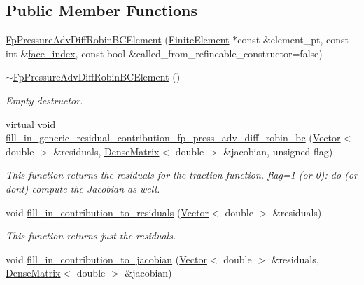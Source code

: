\subsection*{Public Member Functions}
\begin{DoxyCompactItemize}
\item 
\hyperlink{classoomph_1_1FpPressureAdvDiffRobinBCElement_a9a21514d6237032042035c70fc14fd7a}{Fp\+Pressure\+Adv\+Diff\+Robin\+B\+C\+Element} (\hyperlink{classoomph_1_1FiniteElement}{Finite\+Element} $\ast$const \&element\+\_\+pt, const int \&\hyperlink{classoomph_1_1FaceElement_a478d577ac6db67ecc80f1f02ae3ab170}{face\+\_\+index}, const bool \&called\+\_\+from\+\_\+refineable\+\_\+constructor=false)
\item 
\hyperlink{classoomph_1_1FpPressureAdvDiffRobinBCElement_af684bf56d91023d4adaaaec1419a3216}{$\sim$\+Fp\+Pressure\+Adv\+Diff\+Robin\+B\+C\+Element} ()
\begin{DoxyCompactList}\small\item\em Empty destructor. \end{DoxyCompactList}\item 
virtual void \hyperlink{classoomph_1_1FpPressureAdvDiffRobinBCElement_a6a902a30a8b1c2d4105a7c0639a81f58}{fill\+\_\+in\+\_\+generic\+\_\+residual\+\_\+contribution\+\_\+fp\+\_\+press\+\_\+adv\+\_\+diff\+\_\+robin\+\_\+bc} (\hyperlink{classoomph_1_1Vector}{Vector}$<$ double $>$ \&residuals, \hyperlink{classoomph_1_1DenseMatrix}{Dense\+Matrix}$<$ double $>$ \&jacobian, unsigned flag)
\begin{DoxyCompactList}\small\item\em This function returns the residuals for the traction function. flag=1 (or 0)\+: do (or don\textquotesingle{}t) compute the Jacobian as well. \end{DoxyCompactList}\item 
void \hyperlink{classoomph_1_1FpPressureAdvDiffRobinBCElement_aac5e0cb0802ef44486750754df02054d}{fill\+\_\+in\+\_\+contribution\+\_\+to\+\_\+residuals} (\hyperlink{classoomph_1_1Vector}{Vector}$<$ double $>$ \&residuals)
\begin{DoxyCompactList}\small\item\em This function returns just the residuals. \end{DoxyCompactList}\item 
void \hyperlink{classoomph_1_1FpPressureAdvDiffRobinBCElement_aa9504d4561f8e4030d9a7a6bf4015ce7}{fill\+\_\+in\+\_\+contribution\+\_\+to\+\_\+jacobian} (\hyperlink{classoomph_1_1Vector}{Vector}$<$ double $>$ \&residuals, \hyperlink{classoomph_1_1DenseMatrix}{Dense\+Matrix}$<$ double $>$ \&jacobian)

\end{DoxyCompactItemize}
